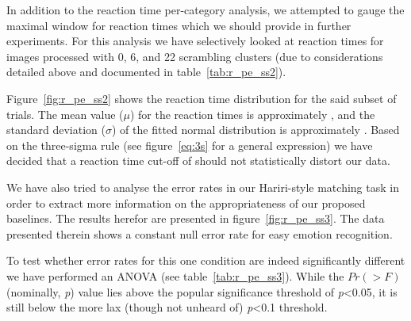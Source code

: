 	    In addition to the reaction time per-category analysis, we attempted to gauge the maximal window for reaction times which we should provide in further experiments.
	    For this analysis we have selectively looked at reaction times for images processed with \SI{0}{\pixel}, \SI{6}{\pixel}, and \SI{22}{\pixel} scrambling clusters (due to considerations detailed above and documented in table~\ref{tab:r_pe_ss2}).
	    
	    Figure~\ref{fig:r_pe_ss2} shows the reaction time distribution for the said subset of trials.
	    The mean value ($\mu$) for the reaction times is approximately , 
	    and the standard deviation ($\sigma$) of the fitted normal distribution is approximately .
	    Based on the three-sigma rule (see figure~\ref{eq:3s} for a general expression) we have decided that a reaction time cut-off of  should not statistically distort our data.
	    
	    We have also tried to analyse the error rates in our Hariri-style matching task in order to extract more information on the appropriateness of our proposed baselines.
	    The results herefor are presented in figure~\ref{fig:r_pe_ss3}.
	    The data presented therein shows a constant null error rate for easy emotion recognition.
	    
	    To test whether error rates for this one condition are indeed significantly different we have performed an ANOVA (see table~\ref{tab:r_pe_ss3}).
	    While the $Pr(>F)$ (nominally, \textit{p}) value lies above the popular significance threshold of \textit{p}<0.05, 
	    it is still below the more lax (though not unheard of) \textit{p}<0.1 threshold.
	    
